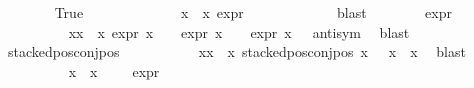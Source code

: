 \begin{isabellebody}
\ \ \ \ \ \ \isamarkupfalse%
\ True\isanewline
\ \ \ \ \ \ \isamarkupfalse%
\ \isamarkupfalse%
\ {\isasymphi}\ \ {\isachardoublequoteopen}{\isasymphi}\ {\isasymin}\ {\isacharparenleft}{\kern0pt}x{}{}\ {\isacharbackquote}{\kern0pt}\ x{}{}{\isacharparenright}{\kern0pt}{\isachardoublequoteclose}\ {\isachardoublequoteopen}expr{\isacharunderscore}{\kern0pt}{}\ {\isasymphi}\ {\isasymge}\ {}{\isachardoublequoteclose}\isanewline
\ \ \ \ \ \ \ \ \isamarkupfalse%
\ blast\isanewline
\ \ \ \ \ \ \isamarkupfalse%
\ {\isachardoublequoteopen}expr{\isacharunderscore}{\kern0pt}{}\ {\isasymphi}\ {\isacharequal}{\kern0pt}\ {}{\isachardoublequoteclose}\isanewline
\ \ \ \ \ \ \ \ \isamarkupfalse%
\ {\isacartoucheopen}{\isasymforall}x{\isasymin}x{}{}\ {\isacharbackquote}{\kern0pt}\ x{}{}{\isachardot}{\kern0pt}\ expr{\isacharunderscore}{\kern0pt}{}\ x\ {\isasymle}\ {}\ {\isasymand}\ expr{\isacharunderscore}{\kern0pt}{}\ x\ {\isasymle}\ {}\ {\isasymand}\ expr{\isacharunderscore}{\kern0pt}{}\ x\ {\isacharless}{\kern0pt}{\isacharequal}{\kern0pt}\ {}{\isacartoucheclose}\ antisym\ \isamarkupfalse%
\ blast\isanewline
\ \ \ \ \ \ \isamarkupfalse%
\ {\isachardoublequoteopen}stacked{\isacharunderscore}{\kern0pt}pos{\isacharunderscore}{\kern0pt}conj{\isacharunderscore}{\kern0pt}pos\ {\isasymphi}{\isachardoublequoteclose}\isanewline
\ \ \ \ \ \ \ \ \isamarkupfalse%
\ {\isacartoucheopen}{\isasymforall}x{\isasymin}x{}{}\ {\isacharbackquote}{\kern0pt}\ x{}{}{\isachardot}{\kern0pt}\ stacked{\isacharunderscore}{\kern0pt}pos{\isacharunderscore}{\kern0pt}conj{\isacharunderscore}{\kern0pt}pos\ x{\isacartoucheclose}\ {\isacartoucheopen}{\isasymphi}\ {\isasymin}\ x{}{}\ {\isacharbackquote}{\kern0pt}\ x{}{}{\isacartoucheclose}\ \isamarkupfalse%
\ blast\isanewline
\ \ \ \ \ \ \isamarkupfalse%
\ {\isachardoublequoteopen}{\isasymforall}{\isasympsi}\ {\isasymin}\ {\isacharparenleft}{\kern0pt}x{}{}\ {\isacharbackquote}{\kern0pt}\ x{}{}{\isacharparenright}{\kern0pt}{\isachardot}{\kern0pt}\ {\isasympsi}\ {\isasymnoteq}\ {\isasymphi}\ {\isasymlongrightarrow}\ expr{\isacharunderscore}{\kern0pt}{}\ {\isasympsi}\ {\isasymle}\ {}{\isachardoublequoteclose}\isanewline

\end{isabellebody}
